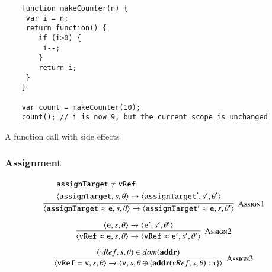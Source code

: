 \documentclass[12pt,a4paper,twoside,openright]{report}
\begin{document}
\begin{program}[t]
 \begin{verbatim}
	function makeCounter(n) {
	 var i = n;
	 return function() {
		if (i>0) {
		 i--;
		}
		return i;
	 }
	}

	var count = makeCounter(10);
	count(); // i is now 9, but the current scope is unchanged
 \end{verbatim}
 \caption{A function call with side effects}\label{lst:sideEffects}
\end{program}

\subsubsection*{Assignment}

$$\infer[\textsc{Assign1}]
{
  \langle \mathtt{assignTarget \approx e}, s, \theta \rangle \rightarrow
  \langle \mathtt{assignTarget' \approx e}, s, \theta' \rangle
}
{
  \begin{split}
  	&\mathtt{assignTarget} \not = \mathtt{vRef} \\
  	&\langle \mathtt{assignTarget}, s, \theta \rangle \rightarrow
	  	\langle \mathtt{assignTarget'}, s', \theta'\rangle
  \end{split}
}$$

$$\infer[\textsc{Assign2}]
{
  \langle\mathtt{vRef\approx e},s,\theta\rangle\rightarrow
  	\langle\mathtt{vRef\approx e'},s',\theta'\rangle
}{
	\langle\mathtt{e},s, \theta\rangle\rightarrow
		\langle\mathtt{e'}, s', \theta'\rangle
}$$

$$\infer[\textsc{Assign3}]
{
  \langle \mathtt{vRef = v}, s, \theta \rangle \rightarrow
  	\langle \mathtt{v}, s, \theta\oplus\{\textbf{addr}(vRef, s, \theta) : v\} \rangle
}
{
  (vRef, s, \theta) \in dom(\textbf{addr})
}$$
\end{document}
